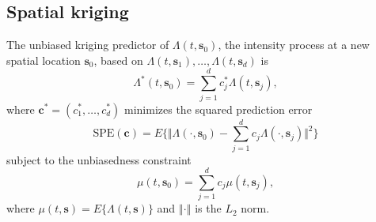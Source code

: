 \documentclass[titlepage,12pt]{article}
\begin{document}
\subsection{Spatial kriging\label{sec:Kriging}}

The unbiased kriging predictor of $\Lambda (t,\mathbf{s}_{0})$, the
intensity process at a new spatial location $\mathbf{s}_{0}$, based on $%
\Lambda (t,\mathbf{s}_{1}),\ldots ,\Lambda (t,\mathbf{s}_{d})$ is 
\begin{equation*}
\Lambda ^{\ast }(t,\mathbf{s}_{0})=\sum_{j=1}^{d}c_{j}^{\ast }\Lambda (t,%
\mathbf{s}_{j}),
\end{equation*}%
where $\mathbf{c}^{\ast }=(c_{1}^{\ast },\ldots ,c_{d}^{\ast })$ minimizes
the squared prediction error 
\begin{equation}
\mathrm{SPE}(\mathbf{c})=E\{\Vert \Lambda (\cdot ,\mathbf{s}%
_{0})-\sum_{j=1}^{d}c_{j}\Lambda (\cdot ,\mathbf{s}_{j})\Vert ^{2}\}
\label{eq:SPE}
\end{equation}%
subject to the unbiasedness constraint 
\begin{equation}
\mu (t,\mathbf{s}_{0})=\sum_{j=1}^{d}c_{j}\mu (t,\mathbf{s}_{j}),
\label{eq:constraint}
\end{equation}%
where $\mu (t,\mathbf{s})=E\{\Lambda (t,\mathbf{s})\}$ and $\left\Vert \cdot
\right\Vert $ is the $L_{2}$ norm.
\end{document}
